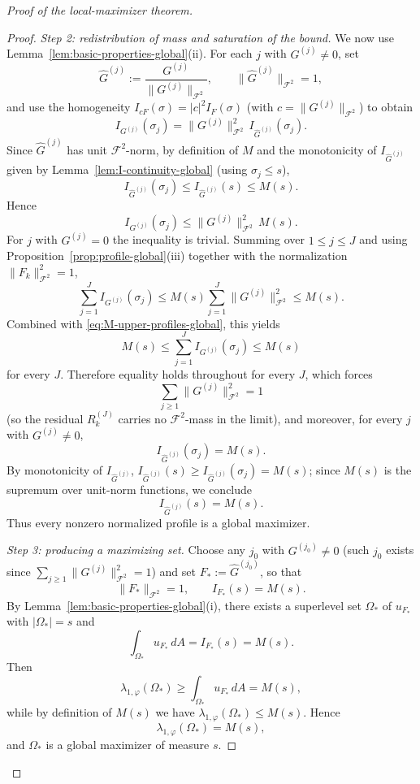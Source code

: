 \documentclass[a4paper,11pt,reqno]{amsart}
\numberwithin{equation}{section}
\theoremstyle{plain} %
\theoremstyle{definition} %
\theoremstyle{remark}
\begin{document}
\begin{proof}[Proof of the local-maximizer theorem]
\begin{proof}
\medskip
\noindent\emph{Step 2: redistribution of mass and saturation of the bound.}
We now use Lemma~\ref{lem:basic-properties-global}(ii). For each \(j\) with
\(G^{(j)}\neq 0\), set
\[
\widehat G^{(j)}:=\frac{G^{(j)}}{\|G^{(j)}\|_{\mathcal F^2}},
\qquad
\|\widehat G^{(j)}\|_{\mathcal F^2}=1,
\]
and use the homogeneity \(I_{cF}(\sigma)=|c|^2 I_F(\sigma)\) (with
\(c=\|G^{(j)}\|_{\mathcal F^2}\)) to obtain
\[
I_{G^{(j)}}(\sigma_j)
=
\|G^{(j)}\|_{\mathcal F^2}^2
\,I_{\widehat G^{(j)}}(\sigma_j).
\]
Since \(\widehat G^{(j)}\) has unit \(\mathcal F^2\)-norm, by definition of
\(M\) and the monotonicity of \(I_{\widehat G^{(j)}}\) given by
Lemma~\ref{lem:I-continuity-global} (using \(\sigma_j\le s\)),
\[
I_{\widehat G^{(j)}}(\sigma_j)\le I_{\widehat G^{(j)}}(s)\le M(s).
\]
Hence
\[
I_{G^{(j)}}(\sigma_j)\le \|G^{(j)}\|_{\mathcal F^2}^2\, M(s).
\]
For \(j\) with \(G^{(j)}=0\) the inequality is trivial. Summing over
\(1\le j\le J\) and using Proposition~\ref{prop:profile-global}(iii)
together with the normalization \(\|F_k\|_{\mathcal F^2}^2=1\),
\[
\sum_{j=1}^J I_{G^{(j)}}(\sigma_j)
\le
M(s)\sum_{j=1}^J \|G^{(j)}\|_{\mathcal F^2}^2
\le M(s).
\]
Combined with \eqref{eq:M-upper-profiles-global}, this yields
\[
M(s)\le \sum_{j=1}^J I_{G^{(j)}}(\sigma_j)\le M(s)
\]
for every \(J\). Therefore equality holds throughout for every \(J\), which
forces
\[
\sum_{j\ge 1}\|G^{(j)}\|_{\mathcal F^2}^2=1
\]
(so the residual \(R_k^{(J)}\) carries no \(\mathcal F^2\)-mass in the
limit), and moreover, for every \(j\) with \(G^{(j)}\neq 0\),
\[
I_{\widehat G^{(j)}}(\sigma_j)=M(s).
\]
By monotonicity of \(I_{\widehat G^{(j)}}\),
\(I_{\widehat G^{(j)}}(s)\ge I_{\widehat G^{(j)}}(\sigma_j)=M(s)\); since
\(M(s)\) is the supremum over unit-norm functions, we conclude
\[
I_{\widehat G^{(j)}}(s)=M(s).
\]
Thus every nonzero normalized profile is a global maximizer.

\medskip
\noindent\emph{Step 3: producing a maximizing set.}
Choose any \(j_0\) with \(G^{(j_0)}\neq 0\) (such \(j_0\) exists since
\(\sum_{j\ge 1}\|G^{(j)}\|_{\mathcal F^2}^2=1\)) and set
\(F_*:=\widehat G^{(j_0)}\), so that
\[
\|F_*\|_{\mathcal F^2}=1,
\qquad
I_{F_*}(s)=M(s).
\]
By Lemma~\ref{lem:basic-properties-global}(i), there exists a superlevel
set \(\Omega_*\) of \(u_{F_*}\) with \(|\Omega_*|=s\) and
\[
\int_{\Omega_*}u_{F_*}\,dA=I_{F_*}(s)=M(s).
\]
Then
\[
\lambda_{1,\varphi}(\Omega_*)\ge \int_{\Omega_*}u_{F_*}\,dA=M(s),
\]
while by definition of \(M(s)\) we have
\(\lambda_{1,\varphi}(\Omega_*)\le M(s)\). Hence
\[
\lambda_{1,\varphi}(\Omega_*)=M(s),
\]
and \(\Omega_*\) is a global maximizer of measure \(s\).
\end{proof}


\end{proof}
\end{document}
